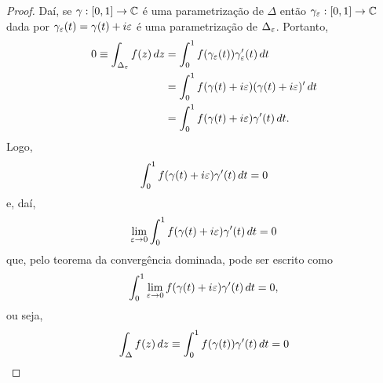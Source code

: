 \begin{proof}
        Daí, se $\gamma:[0,1]\to\mathbb{C}$ é uma parametrização de $\Delta$ então
        $\gamma_{\varepsilon}:[0,1]\to\mathbb{C}$ dada por 
        $\gamma_{\varepsilon}(t) = \gamma(t) + i\varepsilon$ é uma parametrização de
        $\Delta_{\varepsilon}$. Portanto,
        \begin{align*}
            0 \equiv \int_{\Delta_{\varepsilon}} f(z)\, dz 
            &= \int_0^1 f(\gamma_{\varepsilon}(t))\gamma_{\varepsilon}'(t)\, dt \\
            &= \int_0^1 f(\gamma(t) + i\varepsilon)(\gamma(t) + i\varepsilon)'\, dt \\
            &= \int_0^1 f(\gamma(t) + i\varepsilon)\gamma'(t)\, dt.
        \end{align*}
        Logo, 
        \begin{equation*}
            \int_0^1 f(\gamma(t) + i\varepsilon)\gamma'(t)\, dt = 0
        \end{equation*}
        e, daí,
        \begin{align*}
            \lim_{\varepsilon\to 0} \int_0^1 f(\gamma(t) + i\varepsilon)\gamma'(t)\, dt = 0
        \end{align*}
        que, pelo teorema da convergência dominada, pode ser escrito como
        \begin{equation*}
            \int_0^1 \lim_{\varepsilon\to 0} f(\gamma(t) + i\varepsilon)\gamma'(t)\, dt = 0,
        \end{equation*}
        ou seja,
        \begin{equation*}
            \int_\Delta f(z)\, dz \equiv \int_0^1 f(\gamma(t))\gamma'(t)\, dt = 0
        \end{equation*}

\end{proof}

